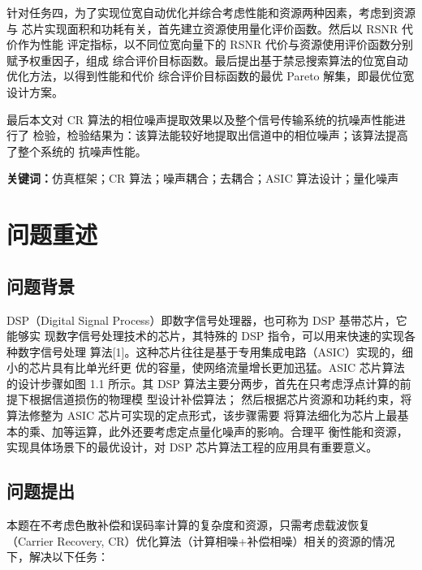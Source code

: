 \documentclass[a4paper,10pt]{my_paper}
\numberwithin{equation}{section}
\begin{document}
针对任务四，为了实现位宽自动优化并综合考虑性能和资源两种因素，考虑到资源与
芯片实现面积和功耗有关，首先建立资源使用量化评价函数。然后以 RSNR 代价作为性能
评定指标，以不同位宽向量下的 RSNR 代价与资源使用评价函数分别赋予权重因子，组成
综合评价目标函数。最后提出基于禁忌搜索算法的位宽自动优化方法，以得到性能和代价
综合评价目标函数的最优 Pareto 解集，即最优位宽设计方案。

最后本文对 CR 算法的相位噪声提取效果以及整个信号传输系统的抗噪声性能进行了
检验，检验结果为：该算法能较好地提取出信道中的相位噪声；该算法提高了整个系统的
抗噪声性能。

\vspace{1em}
\noindent \textbf{关键词：}仿真框架；CR 算法；噪声耦合；去耦合；ASIC 算法设计；量化噪声



\newpage

\begin{center}
\tableofcontents
\end{center}

\newpage
\section{问题重述}
\subsection{问题背景}
DSP（Digital Signal Process）即数字信号处理器，也可称为 DSP 基带芯片，它能够实
现数字信号处理技术的芯片，其特殊的 DSP 指令，可以用来快速的实现各种数字信号处理
算法[1]。这种芯片往往是基于专用集成电路（ASIC）实现的，细小的芯片具有比单光纤更
优的容量，使网络流量增长更加迅猛。ASIC 芯片算法的设计步骤如图 1.1 所示。其 DSP
算法主要分两步，首先在只考虑浮点计算的前提下根据信道损伤的物理模    型设计补偿算法；
然后根据芯片资源和功耗约束，将算法修整为 ASIC 芯片可实现的定点形式，该步骤需要
将算法细化为芯片上最基本的乘、加等运算，此外还要考虑定点量化噪声的影响。合理平 衡性能和资源，实现具体场景下的最优设计，对 DSP 芯片算法工程的应用具有重要意义。

\subsection{问题提出}
本题在不考虑色散补偿和误码率计算的复杂度和资源，只需考虑载波恢复（Carrier 
Recovery, CR）优化算法（计算相噪+补偿相噪）相关的资源的情况下，解决以下任务：
\end{document}
